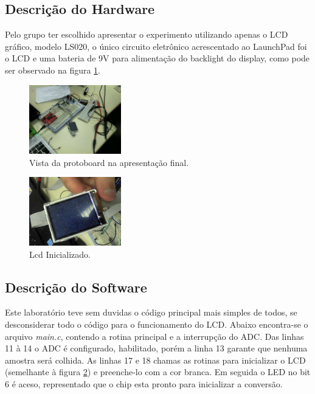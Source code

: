 
\subsection{Descrição do Hardware}\label{hardware}

	Pelo grupo ter escolhido apresentar o experimento utilizando apenas o LCD gráfico, modelo LS020, o único circuito eletrônico acrescentado ao LaunchPad foi o LCD e uma bateria de 9V para alimentação do backlight do display, como pode ser observado na figura \ref{f1}.

\begin{figure} %
  \centering
  \includegraphics[width=4cm]{./fts/snapshot-001}
  \caption{Vista da protoboard na apresentação final.}
  \label{f1}
\end{figure}



\begin{figure} %
  \centering
  \includegraphics[width=4cm,angle=270]{./fts/f1}
  \caption{Lcd Inicializado.}
  \label{lcd1}
\end{figure}

\subsection{Descrição do Software}\label{software}

Este laboratório teve sem duvidas o código principal mais simples de todos, se desconsiderar todo o código para o funcionamento do LCD. Abaixo encontra-se o arquivo \textit{main.c}, contendo a rotina principal e a interrupção do ADC. Das linhas 11 à 14 o ADC é configurado, habilitado, porém a linha 13 garante que nenhuma amostra será colhida. As linhas 17 e 18 chamas as rotinas para inicializar o LCD (semelhante à figura \ref{lcd1}) e preenche-lo com a cor branca. Em seguida o LED no bit 6 é aceso, representado que o chip esta pronto para inicializar a conversão.

